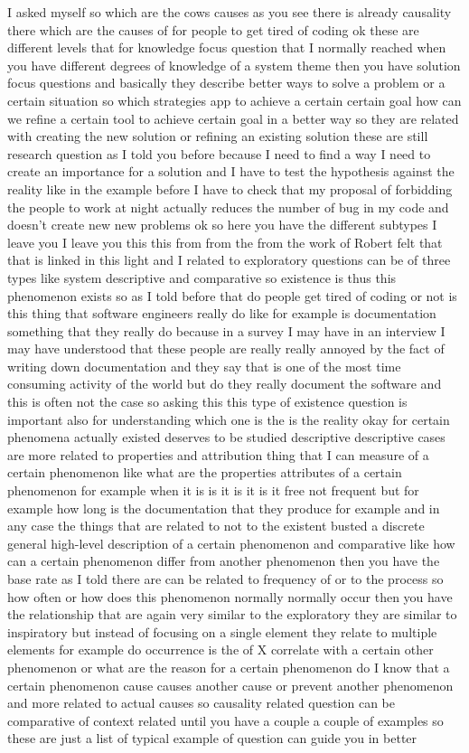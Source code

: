 \documentclass[conference, compsoc, twoside]{IEEEtran}
\begin{document}
I asked myself so which are the cows causes as you see there is already causality there which are the causes of for people to get tired of coding ok these are different levels that for knowledge focus question that I normally reached when you have different degrees of knowledge of a system theme then you have solution focus questions and basically they describe better ways to solve a problem or a certain situation so which strategies app to achieve a certain certain goal how can we refine a certain tool to achieve certain goal in a better way so they are related with creating the new solution or refining an existing solution these are still research question as I told you before because I need to find a way I need to create an importance for a solution and I have to test the hypothesis against the reality like in the example before I have to check that my proposal of forbidding the people to work at night actually reduces the number of bug in my code and doesn't create new new problems ok so here you have the different subtypes I leave you I leave you this this from from the from the work of Robert felt that that is linked in this light and I related to exploratory questions can be of three types like system descriptive and comparative so existence is thus this phenomenon exists so as I told before that do people get tired of coding or not is this thing that software engineers really do like for example is documentation something that they really do because in a survey I may have in an interview I may have understood that these people are really really annoyed by the fact of writing down documentation and they say that is one of the most time consuming activity of the world but do they really document the software and this is often not the case so asking this this type of existence question is important also for understanding which one is the is the reality okay for certain phenomena actually existed deserves to be studied descriptive descriptive cases are more related to properties and attribution thing that I can measure of a certain phenomenon like what are the properties attributes of a certain phenomenon for example when it is is it is it is it free not frequent but for example how long is the documentation that they produce for example and in any case the things that are related to not to the existent busted a discrete general high-level description of a certain phenomenon and comparative like how can a certain phenomenon differ from another phenomenon then you have the base rate as I told there are can be related to frequency of or to the process so how often or how does this phenomenon normally normally occur then you have the relationship that are again very similar to the exploratory they are similar to inspiratory but instead of focusing on a single element they relate to multiple elements for example do occurrence is the of X correlate with a certain other phenomenon or what are the reason for a certain phenomenon do I know that a certain phenomenon cause causes another cause or prevent another phenomenon and more related to actual causes so causality related question can be comparative of context related until you have a couple a couple of examples so these are just a list of typical example of question can guide you in better 
\end{document}
